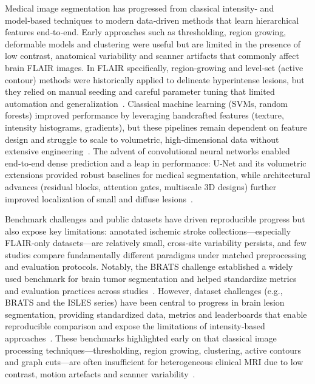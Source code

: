 \documentclass[12pt]{article}
\begin{document}
Medical image segmentation has progressed from classical intensity‑ and model‑based techniques to modern data‑driven methods that learn hierarchical features end‑to‑end. Early approaches such as thresholding, region growing, deformable models and clustering were useful but are limited in the presence of low contrast, anatomical variability and scanner artifacts that commonly affect brain FLAIR images. In FLAIR specifically, region‑growing and level‑set (active contour) methods were historically applied to delineate hyperintense lesions, but they relied on manual seeding and careful parameter tuning that limited automation and generalization~\cite{qianActiveContourModel2013,steinStatisticalDeformableModel2001}. Classical machine learning (SVMs, random forests) improved performance by leveraging handcrafted features (texture, intensity histograms, gradients), but these pipelines remain dependent on feature design and struggle to scale to volumetric, high‑dimensional data without extensive engineering~\cite{geremiaSpatialDecisionForests2011}. The advent of convolutional neural networks enabled end‑to‑end dense prediction and a leap in performance: U‑Net and its volumetric extensions provided robust baselines for medical segmentation, while architectural advances (residual blocks, attention gates, multiscale 3D designs) further improved localization of small and diffuse lesions~\cite{ronnebergerUNetConvolutionalNetworks2015,oktayAttentionUNetLearning2018,He2016,Milletari2016}.

Benchmark challenges and public datasets have driven reproducible progress but also expose key limitations: annotated ischemic stroke collections—especially FLAIR‑only datasets—are relatively small, cross‑site variability persists, and few studies compare fundamentally different paradigms under matched preprocessing and evaluation protocols. Notably, the BRATS challenge established a widely used benchmark for brain tumor segmentation and helped standardize metrics and evaluation practices across studies~\cite{Menze2015}. However, dataset challenges (e.g., BRATS and the ISLES series) have been central to progress in brain lesion segmentation, providing standardized data, metrics and leaderboards that enable reproducible comparison and expose the limitations of intensity‑based approaches~\cite{Menze2015}. These benchmarks highlighted early on that classical image processing techniques—thresholding, region growing, clustering, active contours and graph cuts—are often insufficient for heterogeneous clinical MRI due to low contrast, motion artefacts and scanner variability~\cite{qianActiveContourModel2013,steinStatisticalDeformableModel2001,boykovInteractiveGraphCuts2001}. 
\end{document}

